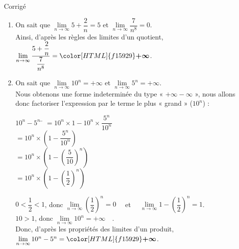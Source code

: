 \documentclass[a4paper,11pt,exos]{nsi} %
\newcounter{corNum}
\newcommand{\cor}[1]
{
	\addtocounter{corNum}{1}
	{\titlefont\color{UGLiOrange}\Large Corrigé\ \thecorNum\ \normalsize{#1}}\smallskip	
}
\begin{document}
\cor{}
\begin{enumerate}
     \item On sait que $\lim\limits_{n\to\infty} 5+\dfrac{2}{n}=5$ et $\lim\limits_{n\to\infty} \dfrac{7}{n^8}=0$.\\Ainsi, d'après les règles des limites d'un quotient, $\lim\limits_{n\to\infty} \dfrac{5+\dfrac{2}{n}}{\dfrac{7}{n^8}}={\color[HTML]{f15929}\boldsymbol{+\infty}}$.

     
     \item On sait que $\lim\limits_{n\to\infty} 10^n=+\infty$ et $\lim\limits_{n\to\infty} 5^n=+\infty$.\\[.5em]
     Nous obtenons une forme indeterminée du type « $+\infty-\infty$ », nous allons donc factoriser l'expression par le terme le plus « grand » ($10^n$) :
     \begin{tabbing}
         $10^n-5^n$    \=  $=10^n\times 1- 10^n \times \dfrac{5^n}{10^n}$\\[.5em]
         \>  $=10^n\times \left(1-\dfrac{5^n}{10^n}\right)$\\[.5em]
         \> $=10^n\times \left(1-\left(\dfrac{5}{10}\right)^n\right)$\\[.5em]
         \> $=10^n\times \left(1-\left(\dfrac{1}{2}\right)^n\right)$
     \end{tabbing} 
     $0<\dfrac{1}{2}<1$, donc $\lim\limits_{n\to\infty}  \left(\dfrac{1}{2}\right)^n=0\quad$ et $\quad \lim\limits_{n\to\infty}  1-\left(\dfrac{1}{2}\right)^n=1$.\\[.5em]
     $10>1$, donc $\lim\limits_{n\to\infty} 10^n=+\infty\quad$.\\[.5em]
     Donc, d'après les propriétés des limites d'un produit, $\lim\limits_{n\to\infty} 10^n-5^n={\color[HTML]{f15929}\boldsymbol{+\infty}}$.
\end{enumerate}
\end{document}
